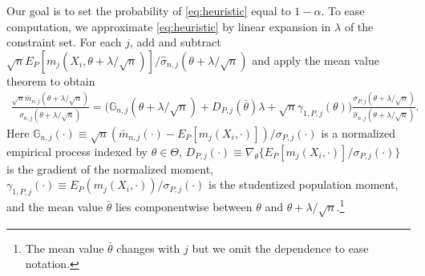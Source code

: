 \documentclass[letterpaper,11pt]{article}
\theoremstyle{myplain}
\theoremstyle{mydefinition}
\theoremstyle{myremark}
\numberwithin{equation}{section}
\numberwithin{figure}{section}
\begin{document}
Our goal is to set the probability of \eqref{eq:heuristic} equal to $1-\alpha$. To ease computation, we approximate \eqref{eq:heuristic} by linear expansion in $\lambda$ of the constraint set. For each $j$, add and subtract $\sqrt n E_P[m_j(X_i,\theta+\lambda/\sqrt n)]/\hat\sigma_{n,j}(\theta+\lambda/\sqrt n)$ and apply the mean value theorem to obtain
\begin{eqnarray}
	\frac{\sqrt n\bar m_{n,j}\left(\theta+\lambda/\sqrt n\right)}{\hat\sigma_{n,j}\left(\theta+\lambda/\sqrt n\right)}
	= \bigl(\mathbb{G}_{n,j}\left(\theta+\lambda/\sqrt n\right)  + D_{P,j}(\bar\theta)\lambda+\sqrt n\gamma_{1,P,j}(\theta)\bigr)\frac{\sigma_{P,j}\left(\theta+\lambda/\sqrt n\right)}{\hat{\sigma}_{n,j}\left(\theta+\lambda/\sqrt n\right)} \label{eq:mean_val_exp}.
\end{eqnarray}
Here $\mathbb G_{n,j}(\cdot) \equiv \sqrt n (\bar m_{n,j}(\cdot)-E_P[m_j(X_i,\cdot)])/\sigma_{P,j}(\cdot)$ is a normalized empirical process indexed by $\theta\in \Theta$,
$D_{P,j}(\cdot)\equiv\nabla_\theta \{E_P[m_j(X_i,\cdot)]/\sigma_{P,j}(\cdot)\}$ is the gradient of the normalized moment, $\gamma_{1,P,j}(\cdot)\equiv E_P(m_j(X_i,\cdot))/\sigma_{P,j}(\cdot)$ is the studentized population moment,
and the mean value $\bar\theta$ lies componentwise between $\theta$ and $\theta+\lambda/\sqrt n$.\footnote{\label{ftn:bar_theta_j}The mean value $\bar\theta$ changes with $j$ but we omit the dependence to ease notation.}
\end{document}
